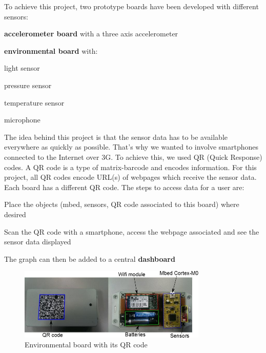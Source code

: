 \documentclass[pdftex,10pt,a4paper]{report}
\newenvironment{packed_item}{
\begin{itemize}
  \setlength{\itemsep}{1pt}
  \setlength{\parskip}{0pt}
  \setlength{\parsep}{0pt}
}{\end{itemize}}
\begin{document}
To achieve this project, two prototype boards have been developed with different sensors:

\begin{packed_item}
	\item \textbf{accelerometer board} with a three axis accelerometer
	\item \textbf{environmental board} with:
		\begin{packed_item}
			\item light sensor
			\item pressure sensor
			\item temperature sensor
			\item microphone
		\end{packed_item}
\end {packed_item}

The idea behind this project is that the sensor data has to be available everywhere as quickly as possible. That's why we wanted to involve smartphones connected to the Internet over 3G. To achieve this, we used QR (Quick Response) codes. A QR code is a type of matrix-barcode and encodes information. For this project, all QR codes encode URL(s) of webpages which receive the sensor data. Each board has a different QR code. The steps to access data for a user are:

\begin{packed_item}
	\item Place the objects (mbed, sensors, QR code associated to this board) where desired
	\item Scan the QR code with a smartphone, access the webpage associated and see the sensor data displayed
	\item The graph can then be added to a central \textbf{dashboard}
\end{packed_item}

\begin{figure}[h!]
		\centering
		\includegraphics[width=0.8\textwidth]{./env_board_qr.jpg}
		\caption{Environmental board with its QR code}
		\label{Environmental board with its QR code}
\end{figure}
\end{document}
